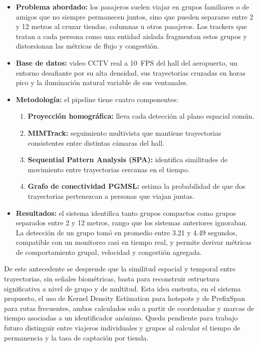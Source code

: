 \documentclass[12pt,letterpaper]{article}
\begin{document}
\begin{itemize}
    \item \textbf{Problema abordado:} los pasajeros suelen viajar en
    grupos familiares o de amigos que no siempre permanecen juntos, sino
    que pueden separarse entre 2 y 12 metros al cruzar tiendas, columnas
    u otros pasajeros. Los trackers que tratan a cada persona como una
    entidad aislada fragmentan estos grupos y distorsionan las métricas
    de flujo y congestión.

    \item \textbf{Base de datos:} video CCTV real a 10~FPS del hall del
    aeropuerto, un entorno desafiante por su alta densidad, sus
    trayectorias cruzadas en horas pico y la iluminación natural variable
    de sus ventanales.

    \item \textbf{Metodología:} el pipeline tiene cuatro componentes:
    \begin{enumerate}
        \item \textbf{Proyección homográfica:} lleva cada detección al
        plano espacial común.
        \item \textbf{MIMTrack:} seguimiento multivista que mantiene
        trayectorias consistentes entre distintas cámaras del hall.
        \item \textbf{Sequential Pattern Analysis (SPA):} identifica
        similitudes de movimiento entre trayectorias cercanas en el
        tiempo.
        \item \textbf{Grafo de conectividad PGMSL:} estima la
        probabilidad de que dos trayectorias pertenezcan a personas que
        viajan juntas.
    \end{enumerate}

    \item \textbf{Resultados:} el sistema identifica tanto grupos
    compactos como grupos separados entre 2 y 12 metros, rango que los
    sistemas anteriores ignoraban. La detección de un grupo tomó en
    promedio entre 3.21 y 4.49 segundos, compatible con un monitoreo casi
    en tiempo real, y permite derivar métricas de comportamiento grupal,
    velocidad y congestión agregada.
\end{itemize}

De este antecedente se desprende que la similitud espacial y temporal
entre trayectorias, sin señales biométricas, basta para reconstruir
estructura significativa a nivel de grupo y de multitud. Esta idea
sustenta, en el sistema propuesto, el uso de Kernel Density Estimation
para hotspots y de PrefixSpan para rutas frecuentes, ambos calculados
solo a partir de coordenadas y marcas de tiempo asociadas a un
identificador anónimo. Queda pendiente para trabajo futuro distinguir
entre viajeros individuales y grupos al calcular el tiempo de permanencia
y la tasa de captación por tienda.
\end{document}
